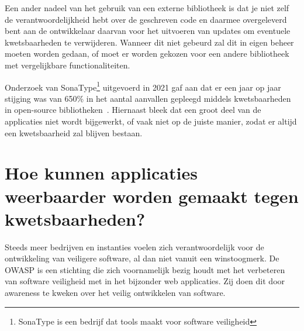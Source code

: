 Een ander nadeel van het gebruik van een externe bibliotheek is dat je niet zelf de verantwoordelijkheid hebt over de geschreven code en daarmee overgeleverd bent aan de ontwikkelaar daarvan voor het uitvoeren van updates om eventuele kwetsbaarheden te verwijderen. Wanneer dit niet gebeurd zal dit in eigen beheer moeten worden gedaan, of moet er worden gekozen voor een andere bibliotheek met vergelijkbare functionaliteiten.

Onderzoek van SonaType\footnote{SonaType is een bedrijf dat tools maakt voor software veiligheid} uitgevoerd in 2021 gaf aan dat er een jaar op jaar stijging was van 650\% in het aantal aanvallen gepleegd middels kwetsbaarheden in open-source bibliotheken~\citep{Sonatype:2021}.
Hiernaast bleek dat een groot deel van de applicaties niet wordt bijgewerkt, of vaak niet op de juiste manier, zodat er altijd een kwetsbaarheid zal blijven bestaan.

\section{Hoe kunnen applicaties weerbaarder worden gemaakt tegen kwetsbaarheden?}\label{sec:hoe-kan-er-voorkomen-worden-dat-er-kwetsbaarheden-ontstaan-in-een-applicatie-die-gebruik-maakt-van-externe-bibliotheken?}

Steeds meer bedrijven en instanties voelen zich verantwoordelijk voor de ontwikkeling van veiligere software, al dan niet vanuit een winstoogmerk. De OWASP is een stichting die zich voornamelijk bezig houdt met het verbeteren van software veiligheid met in het bijzonder web applicaties. Zij doen dit door awareness te kweken over het veilig ontwikkelen van software.

